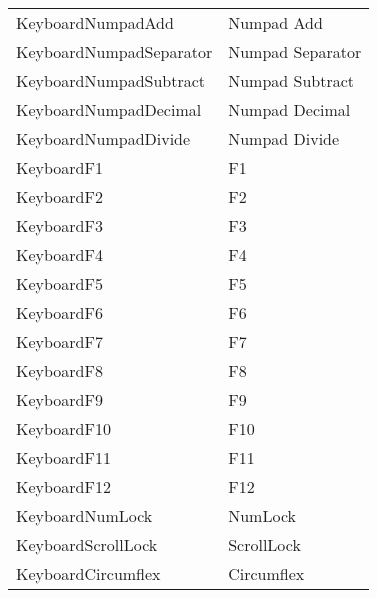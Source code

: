 \begin{center}
\begin{longtable}{ | l | p{10cm} |}
	KeyboardNumpadAdd		&	Numpad Add\\
	KeyboardNumpadSeparator	&	Numpad Separator\\
	KeyboardNumpadSubtract	&	Numpad Subtract\\
	KeyboardNumpadDecimal	&	Numpad Decimal\\
	KeyboardNumpadDivide	&	Numpad Divide\\
	KeyboardF1				&	F1\\
	KeyboardF2				&	F2\\
	KeyboardF3				&	F3\\
	KeyboardF4				&	F4\\
	KeyboardF5				&	F5\\
	KeyboardF6				&	F6\\
	KeyboardF7				&	F7\\
	KeyboardF8				&	F8\\
	KeyboardF9				&	F9\\
	KeyboardF10				&	F10\\
	KeyboardF11				&	F11\\
	KeyboardF12				&	F12\\
	KeyboardNumLock			&	NumLock\\
	KeyboardScrollLock		&	ScrollLock\\
	KeyboardCircumflex		&	Circumflex\\
	\hline
	\end{longtable}
\end{center}


